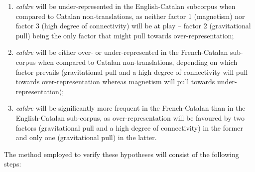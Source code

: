 \documentclass[output=paper,english,spanish,german,english]{langsci/langscibook}
\begin{document}
\begin{enumerate}
  \item \textit{caldre} will be under-represented in the English-Catalan subcorpus when compared to Catalan non-translations, as neither factor 1 (magnetism) nor factor 3 (high degree of connectivity) will be at play -- factor 2 (gravitational pull) being the only factor that might pull towards over-represen\-tation;
  \item \textit{caldre} will be either over- or under-represented in the French-Catalan sub-corpus when compared to Catalan non-translations, depending on which factor prevails (gravitational pull and a high degree of connectivity will pull towards over-representation whereas magnetism will pull towards under-representation);
  \item \textit{caldre} will be significantly more frequent in the French-Catalan than in the English-Catalan sub-corpus, as over-representation will be favoured by two factors (gravitational pull and a high degree of connectivity) in the former and only one (gravitational pull) in the latter.
\end{enumerate}

\noindent The method employed to verify these hypotheses will consist of the following steps:
\end{document}
